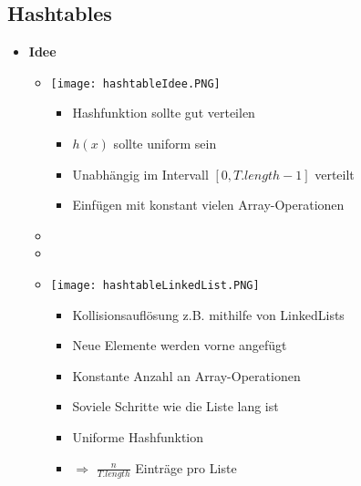 \subsection{Hashtables}
    \begin{itemize}
        \item \textbf{Idee}
            \begin{itemize}
                \item[]
                    \begin{minipage}{0.4\textwidth}
                        \texttt{[image: hashtableIdee.PNG]}
                    \end{minipage}
                    \begin{minipage}{0.5\textwidth}
                        \begin{itemize}
                            \item Hashfunktion sollte gut verteilen
                            \item $h(x)$ sollte uniform sein
                            \item Unabhängig im Intervall $[0, T.length-1]$ verteilt
                            \item Einfügen mit konstant vielen Array-Operationen
                        \end{itemize}
                    \end{minipage}
                \item[]
                \item[]
                \item[]
                    \begin{minipage}{0.4\textwidth}
                        \texttt{[image: hashtableLinkedList.PNG]}
                    \end{minipage}
                    \begin{minipage}{0.5\textwidth}
                        \begin{itemize}
                            \item Kollisionsauflösung z.B. mithilfe von LinkedLists
                            \item Neue Elemente werden vorne angefügt
                            \item Konstante Anzahl an Array-Operationen
                            \item Soviele Schritte wie die Liste lang ist 
                            \item Uniforme Hashfunktion
                            \item[] $\Rightarrow$ $\frac{n}{T.length}$ Einträge pro Liste
                        \end{itemize}
                    \end{minipage}
            \end{itemize}


\end{itemize}
